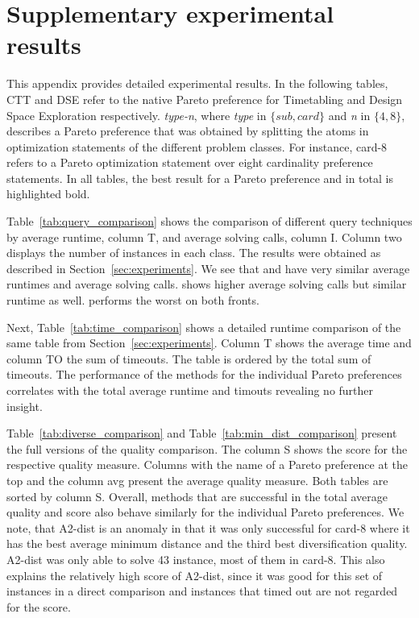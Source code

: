 \section{Supplementary experimental results}
\label{sec:suptables}

This appendix provides detailed experimental results. 
In the following tables, CTT and DSE refer to the native Pareto preference for Timetabling and Design Space Exploration respectively.
\emph{type-n}, where \emph{type} in $\{sub,card\}$ and \emph{n} in $\{4,8\}$, 
describes a Pareto preference that was obtained by splitting the atoms in optimization statements of the different problem classes. 
For instance, card-8 refers to a Pareto optimization statement over eight cardinality preference statements. 
In all tables, the best result for a Pareto preference and in total is highlighted bold. 

Table~\ref{tab:query_comparison} shows the comparison of different query techniques 
by average runtime, column T, and average solving calls, column I.
Column two displays the number of instances in each class.
The results were obtained as described in Section~\ref{sec:experiments}.
We see that  and  have very similar average runtimes and average solving calls.
 shows higher average solving calls but similar runtime as well. 
 performs the worst on both fronts.

Next, Table~\ref{tab:time_comparison} shows a detailed runtime comparison of the same table from Section~\ref{sec:experiments}. 
Column T shows the average time and column TO the sum of timeouts. The table is ordered by the total sum of timeouts.
The performance of the methods for the individual Pareto preferences correlates with the total average runtime and timouts revealing no further insight.

Table~\ref{tab:diverse_comparison} and Table~\ref{tab:min_dist_comparison} present the full versions of the quality comparison. 
The column S shows the score for the respective quality measure.
Columns with the name of a Pareto preference at the top and the column avg present the average quality measure.
Both tables are sorted by column S.
Overall, methods that are successful in the total average quality and score also behave similarly for the individual Pareto preferences.
We note, that A2-dist is an anomaly in that it was only successful for card-8
where it has the best average minimum distance and the third best diversification quality.
A2-dist was only able to solve 43 instance, most of them in card-8.
This also explains the relatively high score of A2-dist, 
since it was good for this set of instances in a direct comparison and instances that timed out are not regarded for the score.

